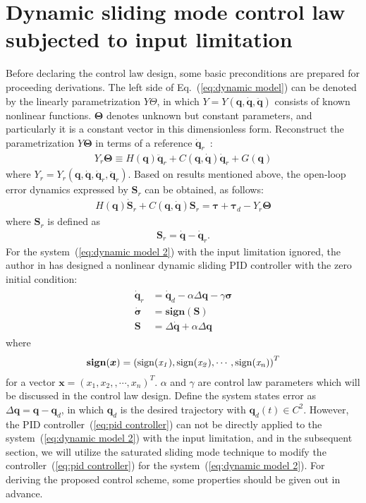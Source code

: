 \documentclass[3p]{elsarticle}
\theoremstyle{plain}
\theoremstyle{remark}
\begin{document}
\section{Dynamic sliding mode control law subjected to input limitation}\label{sec:3}
Before declaring the control law design, some basic preconditions are prepared for proceeding derivations.  The left side of Eq.~(\ref{eq:dynamic model}) can be denoted by the linearly parametrization $Y\Theta$, in which $Y=Y(\bm q,\dot {\bm q},\ddot {\bm q})$ consists of known nonlinear functions. $\bm\Theta$ denotes unknown but constant parameters, and particularly it is a constant vector in this dimensionless form. Reconstruct the parametrization $Y\bm\Theta$ in terms of a reference $\dot{\bm q}_r$~\cite{parra2003dynamic}:
\begin{align}
 Y_r\bm\Theta\equiv H(\bm q)\ddot {\bm q}_r+C(\bm q,\dot {\bm q})\dot {\bm q}_r+G(\bm q)\label{eq:dynamic model 1}
\end{align}
where $Y_r = Y_r(\bm q,\dot{\bm q},\dot{\bm q}_r,\ddot{\bm q}_r)$. Based on results mentioned above, the open-loop error dynamics expressed by $\bm S_r$ can be obtained, as follows:
\begin{align}
H(\bm q)\dot {\bm S}_r+C(\bm q,\dot{\bm q})\bm S_r=\bm\tau +\bm\tau_d- Y_r\bm\Theta\label{eq:dynamic model 2}
\end{align}
where $\bm S_r$ is defined as
\begin{align}
\bm S_r=\dot {\bm q}-\dot {\bm q}_r.\label{eq:Sr1}
\end{align}
For the system~(\ref{eq:dynamic model 2}) with the input limitation ignored, the author in \cite{parra2003dynamic} has designed a nonlinear dynamic sliding PID controller with the zero initial condition:
\begin{align}\begin{split}
\dot {\bm q}_r&=\dot{\bm q}_d-\alpha\Delta\bm q-\gamma\bm\sigma\\
\dot{\bm\sigma}&=\mathbf{sign}(\bm S)\\
\bm S&=\Delta\dot{\bm q}+\alpha\Delta\bm q\label{eq:pid controller}
\end{split}\end{align}
where
\begin{align}
\mathbf{sign}(\bm x) = \left(\rm{sign}(\it{x_1}),\rm{sign}(\it{x_2}),\cdots,\rm{sign}(\it{x_n})\right)^T
\end{align}
for a vector $\bm x=\left(x_1,x_2,,\cdots,x_n\right)^T$. $\alpha$ and $\gamma$ are control law parameters which will be discussed in the control law design. Define the system states error as $\Delta \bm q=\bm q-\bm q_d$, in which $\bm q_d$ is the desired trajectory with $\bm q_d(t)\in C^2$. However, the PID controller~(\ref{eq:pid controller}) can not be directly applied to the system~(\ref{eq:dynamic model 2}) with the input limitation, and in the subsequent section, we will utilize the saturated sliding mode technique to modify the controller~(\ref{eq:pid controller}) for the system~(\ref{eq:dynamic model 2}). For deriving the proposed control scheme, some properties should be given out in advance.
\end{document}
